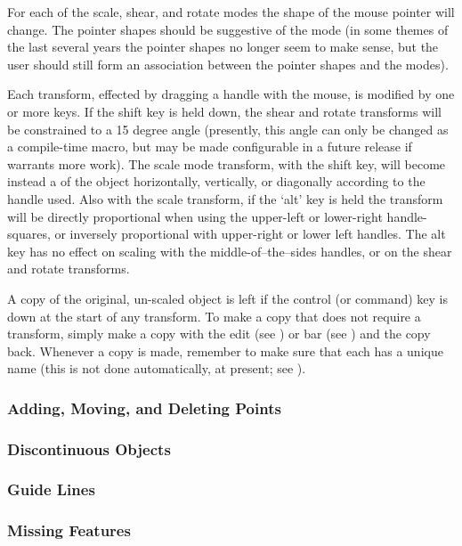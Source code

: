			For each of the
			scale, shear, and rotate modes the shape of the
			mouse pointer will change. The pointer shapes
			should be suggestive of the mode (in some
			 themes of the last several years the
			pointer shapes no longer seem to make sense, but the
			user should still form an association between the
			pointer shapes and the modes).
			
			Each transform, effected by dragging a handle with the
			mouse, is modified by one or more keys.	If the shift
			key is held down, the shear and rotate transforms
			will be constrained to a 15 degree angle (presently,
			this angle can only be changed as a compile-time
			macro, but may be made configurable
			in a future release if \IXpkg{} warrants more work).
			The scale mode transform, with the shift key, will become
			instead a  of the object horizontally,
			vertically, or diagonally according to the handle
			used. Also with the scale transform, if the `alt'
			key is held the transform will be directly proportional
			when using the upper-left or lower-right handle-squares,
			or inversely proportional with upper-right or
			lower left handles. The alt key has no effect on
			scaling with the middle-of--the--sides handles, or on
			the shear and rotate transforms.
			
			A copy of the original, un-scaled object is left
			if the control (or command) key is down
			at the start of any transform. To make a copy that
			does not require a transform, simply make a
			 copy with the edit 
			(see ) or  bar
			(see ) and
			 the copy back. Whenever a copy is
			made, remember to make sure that each has a unique
			name (this is not done automatically, at present;
			see ).
			
			\subsubsection{Adding, Moving, and Deleting Points}%
			\label{sssec:add_del_points}

			\subsubsection{Discontinuous Objects}%
			\label{sssec:discont_objects}

			\subsubsection{Guide Lines}%
			\label{sssec:guide_lines}

			\subsubsection{Missing Features}%
			\label{sssec:missing_todo}

